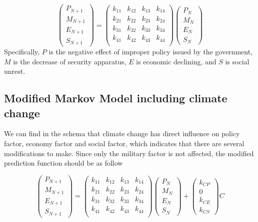 \documentclass{mcmthesis}
\begin{document}
$$
\left(
\begin{matrix}
	P_{N+1} \\ M_{N+1} \\ E_{N+1} \\ S_{N+1}
\end{matrix}
\right) 
= 
\left(
\begin{matrix}
k_{11} & k_{12} & k_{13} & k_{14} \\
k_{21} & k_{22} & k_{23} & k_{24} \\
k_{31} & k_{32} & k_{33} & k_{34} \\
k_{41} & k_{42} & k_{43} & k_{44} \\
\end{matrix}
\right) 
\left(
\begin{matrix}
P_N \\ M_N \\ E_N \\ S_N
\end{matrix}
\right) 
$$
Specifically, $P$ is the negative effect of improper policy issued by the government, $M$ is the decrease of security apparatus, $E$ is economic declining, and $S$ is social unrest.

\subsection{Modified Markov Model including climate change}

We can find in the schema that climate change has direct influence on policy factor, economy factor and social factor, which indicates that there are several modifications to make. Since only the military factor is not affected, the modified prediction function should be as follow

$$
\left(
\begin{matrix}
P_{N+1} \\ M_{N+1} \\ E_{N+1} \\ S_{N+1}
\end{matrix}
\right) 
= 
\left(
\begin{matrix}
k_{11} & k_{12} & k_{13} & k_{14} \\
k_{21} & k_{22} & k_{23} & k_{24} \\
k_{31} & k_{32} & k_{33} & k_{34} \\
k_{41} & k_{42} & k_{43} & k_{44} \\
\end{matrix}
\right) 
\left(
\begin{matrix}
P_N \\ M_N \\ E_N \\ S_N
\end{matrix}
\right) 
+
\left(
\begin{matrix}
k_{CP} \\ {0} \\ k_{CE} \\ k_{CS}
\end{matrix}
\right) 
C
$$
\end{document}
